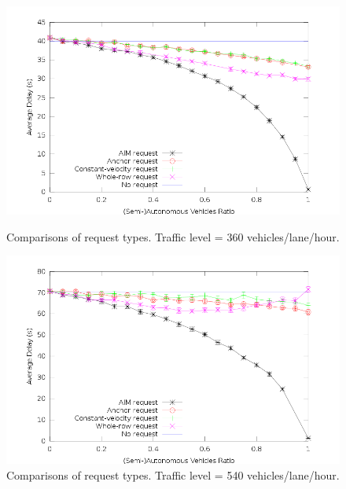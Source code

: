 \begin{figure}[hp]
\centering
\includegraphics[width=0.9\columnwidth]{figures/figure_2.png}
\caption{Comparisons of request types.
Traffic level = 360 vehicles/lane/hour.}
\label{fig:request360}

\mbox{}

\centering
\includegraphics[width=0.9\columnwidth]{figures/figure_5.png}
\caption{Comparisons of request types.
Traffic level = 540 vehicles/lane/hour.}
\label{fig:request540}
\vspace{-.1in}
\end{figure}









